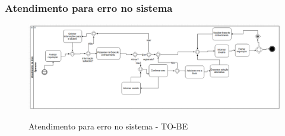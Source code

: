 \subsubsection{Atendimento para erro no sistema}

\begin{figure}[!h]
\caption{Atendimento para erro no sistema - TO-BE}
\centering %
\includegraphics[width=15cm]{to_be/03_atendimento_de_erro.png}
\label{figura:atendimento_de_erro_to_be}
\end{figure}
